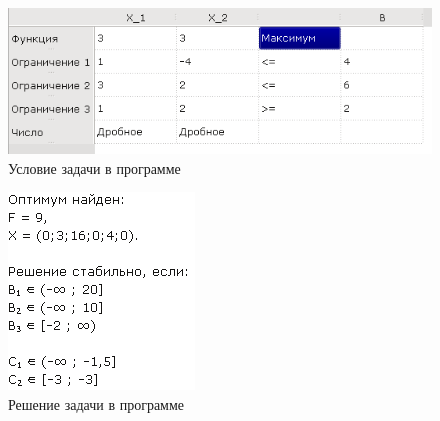 \begin{figure}[hb]
\centering
\includegraphics[scale=1.0]{img/problem21.png}
\caption{Условие задачи в программе}
\end{figure}

\begin{figure}[ht]
\centering
\includegraphics[scale=1.0]{img/solution21.png}
\caption{Решение задачи в программе}
\end{figure}

\newpage
\clearpage
